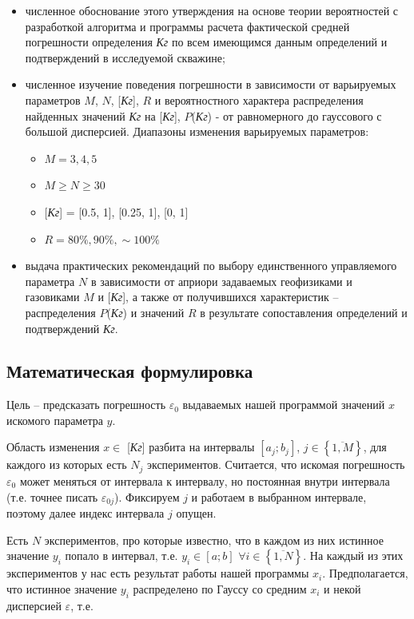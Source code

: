 \documentclass[a4paper,12pt]{article} %
\begin{document}
\begin{itemize}
\item численное обоснование этого утверждения на основе теории вероятностей с разработкой алгоритма и программы расчета фактической средней погрешности определения \emph{Кг} по всем имеющимся данным определений и подтверждений в исследуемой скважине;

\item численное изучение поведения погрешности в зависимости от варьируемых параметров $M$, $N$, [\emph{Кг}], $R$ и вероятностного характера распределения найденных значений \emph{Кг} на  [\emph{Кг}], $P$(\emph{Кг}) - от равномерного до гауссового с большой дисперсией. Диапазоны изменения варьируемых параметров: 

\begin{itemize}
\item $M = 3, 4, 5$
\item $M \geq N \geq 30$
\item $ $[\emph{Кг}] = [0.5, 1], [0.25, 1], [0, 1]
\item $R = 80\%, 90\%, \sim 100\%$
\end{itemize}

\item выдача практических рекомендаций по выбору единственного управляемого параметра $N$ в зависимости от априори задаваемых геофизиками и газовиками $M$  и [\emph{Кг}], а также от получившихся характеристик – распределения $P$(\emph{Кг})  и значений $R$ в результате сопоставления определений и подтверждений \emph{Кг}.

\end{itemize}

\subsection{Математическая формулировка}

Цель -- предсказать погрешность $\varepsilon_0$ выдаваемых нашей программой значений $x$ искомого параметра $y$.

Область изменения $x \in $ [\emph{Кг}] разбита на интервалы $[a_j; b_j]$, $j \in \left\{\overline{1,M}\right\}$, для каждого из которых есть $N_j$ экспериментов. Считается, что искомая погрешность $\varepsilon_0$ может меняться от интервала к интервалу, но постоянная внутри интервала (т.е. точнее писать $\varepsilon_{0j}$). Фиксируем $j$ и работаем в выбранном интервале, поэтому далее индекс интервала $j$ опущен.

Есть $N$ экспериментов, про которые известно, что в каждом из них истинное значение $y_i$ попало в интервал, т.е. $y_i \in [a;b]$ $\forall i \in \left\{\overline{1,N}\right\}$. На каждый из этих экспериментов у нас есть результат работы нашей программы $x_i$. Предполагается, что истинное значение $y_{i}$ распределено по Гауссу со средним $x_i$ и некой дисперсией $\varepsilon$, т.е.
\end{document}
